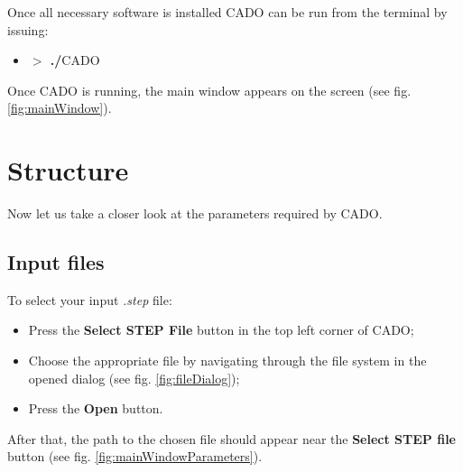 \documentclass[
12pt, %
a4paper, %
oneside, %
headinclude,footinclude, %
BCOR5mm, %
]{scrartcl}
\begin{document}
Once all necessary software is installed CADO can be run from the terminal by issuing:
\begin{itemize}
\item[] \textsf{\textbf{$>$ ./}CADO}
\end{itemize}

Once CADO is running, the main window appears on the screen (see fig. \ref{fig:mainWindow}).



\section{Structure}
\label{sec:structure}
Now let us take a closer look at the parameters required by CADO.

\subsection{Input files}
To select your input \textit{.step} file:
\begin{itemize}
\item Press the \textbf{Select STEP File} button in the top left corner of CADO;
\item Choose the appropriate file by navigating through the file system in the opened dialog (see fig. \ref{fig:fileDialog});
\item Press the \textbf{Open} button.
\end{itemize}

After that, the path to the chosen file should appear near the \textbf{Select STEP file} button (see fig. \ref{fig:mainWindowParameters}).
\end{document}
